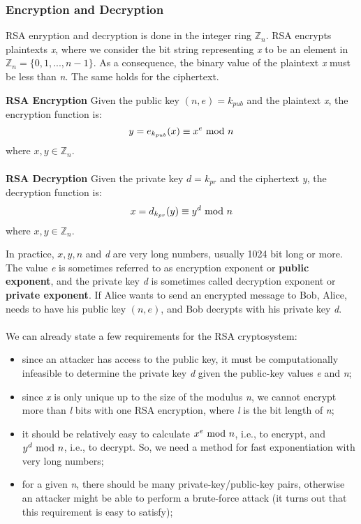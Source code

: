 \subsubsection{Encryption and Decryption}
RSA enryption and decryption is done in the integer ring $\mathbb{Z}_n$. RSA encrypts plaintexts \textit{x}, where we consider the bit string representing \textit{x} to be an element in $\mathbb{Z}_n=\{0,1,...,n-1\}$. As a consequence, the binary value of the plaintext \textit{x} must be less than \textit{n}. The same holds for the ciphertext.
\begin{framed}
    \hfill\break\textbf{RSA Encryption} Given the public key $(n,e)=k_{pub}$ and the plaintext \textit{x}, the encryption function \nolinebreak is:
    $$y=e_{k_{pub}}(x)\equiv x^e\text{ mod } n$$
    where $x,y\in\mathbb{Z}_n.$\\\\
    \textbf{RSA Decryption} Given the private key $d=k_{pr}$ and the ciphertext \textit{y}, the decryption function \nolinebreak is:
    $$x=d_{k_{pr}}(y)\equiv y^d\text{ mod } n$$
    where $x,y\in\mathbb{Z}_n.$
\end{framed}
In practice, $x, y, n$ and \textit{d} are very long numbers, usually 1024 bit long or more. The value \textit{e} is sometimes referred to as encryption exponent or \textbf{public exponent}, and the private key \textit{d} is sometimes called decryption exponent or \textbf{private exponent}. If Alice wants to send an encrypted message to Bob, Alice, needs to have his public key $(n,e)$, and Bob decrypts with his private key \textit{d}.\\\\
We can already state a few requirements for the RSA cryptosystem:
\begin{itemize}
    \item since an attacker has access to the public key, it must be computationally infeasible to determine the private key \textit{d} given the public-key values \textit{e} and \textit{n};
    \item since \textit{x} is only unique up to the size of the modulus \textit{n}, we cannot encrypt more than \textit{l} bits with one RSA encryption, where \textit{l} is the bit length of \textit{n};
    \item it should be relatively easy to calculate $x^e\text{ mod } n$, i.e., to encrypt, and $y^d\text{ mod } n$, i.e., to decrypt. So, we need a method for fast exponentiation with very long numbers;
    \item for a given \textit{n}, there should be many private-key/public-key pairs, otherwise an attacker might be able to perform a brute-force attack (it turns out that this requirement is easy to satisfy);
\end{itemize}

